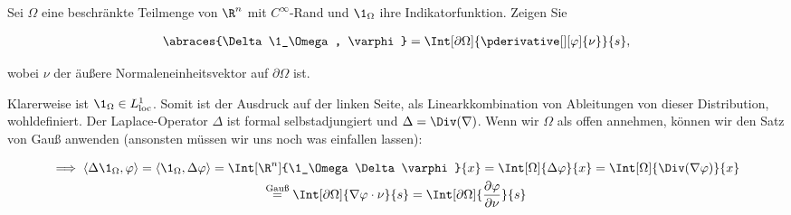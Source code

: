
\begin{exercise}

Sei $\Omega$ eine beschränkte Teilmenge von $\R^n$ mit $C^{\infty}$-Rand und $\1_\Omega$ ihre Indikatorfunktion.
Zeigen Sie

\begin{align*}
  \abraces{\Delta \1_\Omega, \varphi}
  =
  \Int[\partial \Omega]{\pderivative[][\varphi]{\nu}}{s},
\end{align*}

wobei $\nu$ der äußere Normaleneinheitsvektor auf $\partial \Omega$ ist.

\end{exercise}


\begin{solution}

Klarerweise ist $\1_\Omega \in L^1_{\mathrm{loc}}$.
Somit ist der Ausdruck auf der linken Seite, als Linearkkombination von Ableitungen von dieser Distribution, wohldefiniert.
Der Laplace-Operator $\Delta$ ist formal selbstadjungiert und $\Delta = \Div(\nabla)$.
Wenn wir $\Omega$ als offen annehmen, können wir den Satz von Gauß anwenden
(ansonsten müssen wir uns noch was einfallen lassen):

\begin{multline*}
  \implies
  \langle \Delta \1_\Omega, \varphi \rangle
  =
  \langle  \1_\Omega, \Delta \varphi \rangle
  =
  \Int[\R^n]{\1_\Omega \Delta \varphi}{x}
  =
  \Int[\Omega]{\Delta \varphi}{x}
  =
  \Int[\Omega]{\Div(\nabla \varphi)}{x} \\
  \stackrel{\text{Gauß}}{=}
  \Int[\partial \Omega]{\nabla \varphi \cdot \nu}{s}
  =
  \Int[\partial \Omega]{\frac{\partial \varphi}{\partial \nu}}{s}
\end{multline*}

\end{solution}

